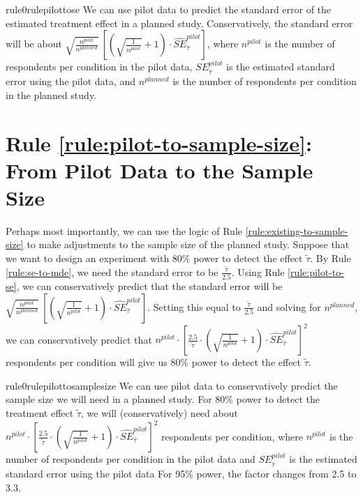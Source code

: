 \documentclass[12pt]{article}
\begin{document}
\begin{restatable}{rule0}{rulepilottose}
\label{rule:pilot-to-se}
We can use pilot data to predict the standard error of the estimated treatment effect in a planned study. Conservatively, the standard error will be about $\sqrt{\frac{n^{pilot}}{n^{planned}}}\ \left\lbrack \left( \sqrt{\frac{1}{n^{pilot}}} + 1 \right) \cdot {\widehat{SE}}_{\widehat{\tau}}^{pilot} \right\rbrack$, where $n^{pilot}$ is the number of respondents per condition in the pilot data, $SE_{\widehat{\tau}}^{pilot}$ is the estimated standard error using the pilot data, and $n^{planned}$ is the number of respondents per condition in the planned study. 
\end{restatable}

\section*{Rule \ref{rule:pilot-to-sample-size}: From Pilot Data to the Sample Size}

Perhaps most importantly, we can use the logic of Rule \ref{rule:existing-to-sample-size} to make adjustments to the sample size of the planned study. 
Suppose that we want to design an experiment with 80\% power to detect the effect $\widetilde{\tau}$. 
By Rule \ref{rule:se-to-mde}, we need the standard error to be $\frac{\widetilde{\tau}}{2.5}$. 
Using Rule \ref{rule:pilot-to-se}, we can conservatively predict that the standard error will be $\sqrt{\frac{n^{pilot}}{n^{planned}}}\ \left\lbrack \left( \sqrt{\frac{1}{n^{pilot}}} + 1 \right) \cdot {\widehat{SE}}_{\widehat{\tau}}^{pilot} \right\rbrack$.
Setting this equal to $\frac{\widetilde{\tau}}{2.5}$ and solving for $n^{planned}$, we can conservatively predict that $n^{pilot} \cdot \left\lbrack \frac{2.5}{\widetilde{\tau}} \cdot \left( \sqrt{\frac{1}{n^{pilot}}} + 1 \right) \cdot {\widehat{SE}}_{\widehat{\tau}}^{pilot} \right\rbrack^{2}$ respondents per condition will give us 80\% power to detect the effect $\widetilde{\tau}$.

\begin{restatable}{rule0}{rulepilottosamplesize}
\label{rule:pilot-to-sample-size}
We can use pilot data to conservatively predict the sample size we will need in a planned study. 
For 80\% power to detect the treatment effect $\widetilde{\tau}$, we will (conservatively) need about $n^{pilot} \cdot \left\lbrack \frac{2.5}{\widetilde{\tau}} \cdot \left( \sqrt{\frac{1}{n^{pilot}}} + 1 \right) \cdot {\widehat{SE}}_{\widehat{\tau}}^{pilot} \right\rbrack^{2}$ respondents per condition, where $n^{pilot}$ is the number of respondents per condition in the pilot data and $SE_{\widehat{\tau}}^{pilot}$ is the estimated standard error using the pilot data
For 95\% power, the factor changes from 2.5 to 3.3.
\end{restatable}
\end{document}
